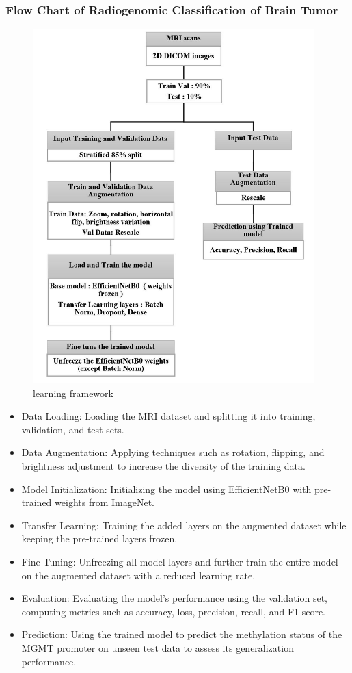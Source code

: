 \documentclass[a4paper,12pt]{extarticle}
\begin{document}
\subsubsection{Flow Chart of Radiogenomic Classification of Brain Tumor}
\begin{figure}[H] %
    \centering
    \includegraphics[width=\linewidth, height=13.7cm, keepaspectratio]{figure/paper1.png}
    \caption{learning framework}
    \label{fig:learning framework}
\end{figure}
\begin{itemize}
    \item Data Loading: Loading the MRI dataset and splitting it into training, validation, and test sets.
    \item Data Augmentation: Applying techniques such as rotation, flipping, and brightness adjustment to increase the diversity of the training data.
    \item Model Initialization: Initializing the model using EfficientNetB0 with pre-trained\cite{kamnitsas2017efficient} weights from ImageNet.
    \item Transfer Learning: Training the added layers on the augmented dataset while keeping the pre-trained layers frozen.
    \item Fine-Tuning: Unfreezing all model layers and further train the entire model on the augmented dataset with a reduced learning rate.
    \item Evaluation: Evaluating the model's performance using the validation set, computing metrics such as accuracy, loss, precision, recall, and F1-score.
    \item Prediction: Using the trained model to predict the methylation status of the MGMT promoter on unseen test data to assess its generalization performance.
\end{itemize}
\end{document}
